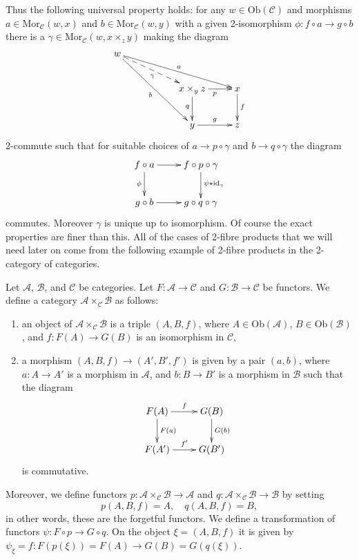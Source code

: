 \noindent
Thus the following universal property holds: for any
$w\in \text{Ob}(\mathcal{C})$ and morphisms
$a \in \text{Mor}_{\mathcal C}(w, x)$ and
$b \in \text{Mor}_{\mathcal{C}}(w, y)$ with a given 2-isomorphism
$\phi : f \circ a \to g\circ b$
there is a $\gamma \in \text{Mor}_{\mathcal C}(w, x\times_z y)$
making the diagram
$$
\xymatrix{
w\ar[rrrd]^a \ar@{-->}[rrd]_\gamma \ar[rrdd]_b &&\\
&&x\times_y z \ar[r]_{p} \ar[d]_{q} & x \ar[d]^{f} \\
&&y \ar[r]^{g} & z }
$$
2-commute such that for suitable choices of
$a \to p \circ \gamma$ and $b \to q \circ \gamma$
the diagram
$$
\xymatrix{
f \circ a \ar[r] \ar[d]_\phi &
f \circ p \circ \gamma
\ar[d]^{\psi \star \text{id}_\gamma}
\\
g\circ b
\ar[r]
&
g \circ q \circ \gamma
}
$$
commutes. Moreover $\gamma$ is unique up to isomorphism.
Of course the exact properties are finer than this. All of the
cases of 2-fibre products that we will need later on come from the following
example of 2-fibre products in the 2-category of categories.

\begin{example}
\label{example-2-fibre-product-categories}
Let $\mathcal{A}$, $\mathcal{B}$, and $\mathcal{C}$ be categories.
Let $F : \mathcal{A} \to \mathcal{C}$ and $G : \mathcal{B} \to \mathcal{C}$
be functors. We define a category
$\mathcal{A}\times_\mathcal{C} \mathcal{B}$ as follows:
\begin{enumerate}
\item an object of $\mathcal{A}\times_\mathcal{C} \mathcal{B}$ is a triple
$(A, B, f)$, where $A\in \text{Ob}(\mathcal{A})$, $B\in \text{Ob}(\mathcal{B})$,
and $f : F(A) \to G(B)$ is an isomorphism in $\mathcal{C}$,
\item a morphism $(A, B, f) \to (A', B', f')$ is given by a pair $(a, b)$, where
$a : A \to A'$ is a morphism in $\mathcal{A}$, and $b : B \to B'$ is a
morphism in $\mathcal{B}$ such that the diagram
$$
\xymatrix{
F(A) \ar[r]^f \ar[d]^{F(a)} & G(B) \ar[d]^{G(b)} \\
F(A') \ar[r]^{f'} & G(B')
}
$$
is commutative.
\end{enumerate}
Moreover, we define functors
$p : \mathcal{A}\times_\mathcal{C}\mathcal{B} \to \mathcal{A}$
and
$q : \mathcal{A}\times_\mathcal{C}\mathcal{B} \to \mathcal{B}$
by setting
$$
p(A, B, f) = A, \quad q(A, B, f) = B,
$$
in other words, these are the forgetful functors.
We define a transformation of functors $\psi : F \circ p \to G \circ q$.
On the object $\xi = (A, B, f)$ it is given by
$\psi_\xi = f : F(p(\xi)) = F(A) \to G(B) = G(q(\xi))$.
\end{example}

